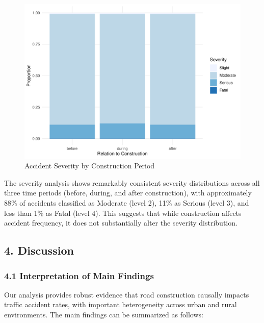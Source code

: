 \documentclass[
]{article}
\begin{document}
\begin{figure}

{\centering \includegraphics[width=1\linewidth]{test_files/figure-latex/severity_figure-1} 

}

\caption{Accident Severity by Construction Period}\label{fig:severity_figure}
\end{figure}

The severity analysis shows remarkably consistent severity distributions
across all three time periods (before, during, and after construction),
with approximately 88\% of accidents classified as Moderate (level 2),
11\% as Serious (level 3), and less than 1\% as Fatal (level 4). This
suggests that while construction affects accident frequency, it does not
substantially alter the severity distribution.

\subsection{4. Discussion}\label{discussion}

\subsubsection{4.1 Interpretation of Main
Findings}\label{interpretation-of-main-findings}

Our analysis provides robust evidence that road construction causally
impacts traffic accident rates, with important heterogeneity across
urban and rural environments. The main findings can be summarized as
follows:
\end{document}
